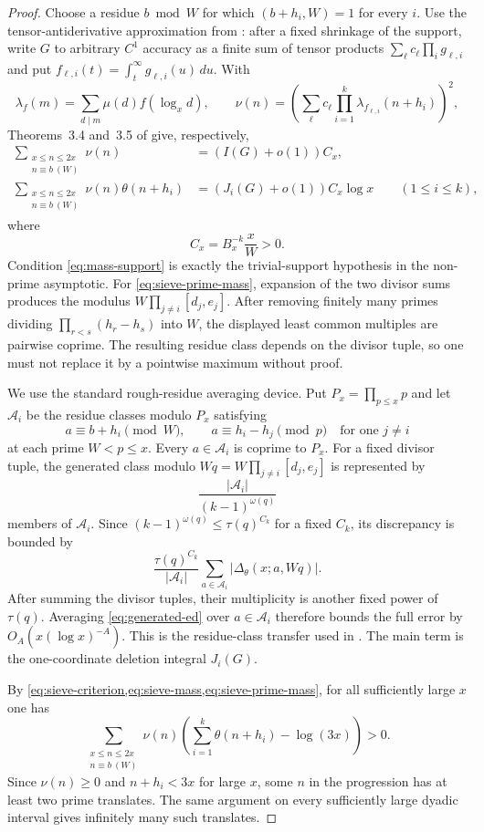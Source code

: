 \begin{proof}
Choose a residue $b\bmod W$ for which $(b+h_i,W)=1$ for every $i$.
Use the tensor-antiderivative approximation from
\cite[Sections~4--5]{PolymathSieve2014}: after a fixed shrinkage of the
support, write $G$ to arbitrary $C^1$ accuracy as a finite sum of tensor
products $\sum_\ell c_\ell\prod_i g_{\ell,i}$ and put
$f_{\ell,i}(t)=\int_t^\infty g_{\ell,i}(u)\,du$.  With
\[
 \lambda_f(m)=\sum_{d\mid m}\mu(d)f(\log_xd),\qquad
 \nu(n)=
 \left(\sum_\ell c_\ell
 \prod_{i=1}^k\lambda_{f_{\ell,i}}(n+h_i)\right)^2,
\]
    Theorems~3.4 and~3.5 of
\cite{PolymathSieve2014,PolymathSieveErratum2015} give, respectively,
\begin{align}
 \sum_{\substack{x\le n\le2x\\n\equiv b\ (W)}}\nu(n)
 &=(I(G)+o(1))C_x,\label{eq:sieve-mass}\\
 \sum_{\substack{x\le n\le2x\\n\equiv b\ (W)}}
 \nu(n)\theta(n+h_i)
 &=\left(J_i(G)+o(1)\right)C_x\log x
 \qquad(1\le i\le k),
 \label{eq:sieve-prime-mass}
\end{align}
where
\[
 C_x=B_x^{-k}\frac{x}{W}>0.
\]
Condition \cref{eq:mass-support} is exactly the trivial-support hypothesis in
the non-prime asymptotic.  For \cref{eq:sieve-prime-mass}, expansion of the
two divisor sums produces the modulus
$W\prod_{j\ne i}[d_j,e_j]$.  After removing finitely many primes dividing
$\prod_{r<s}(h_r-h_s)$ into $W$, the displayed least common multiples are
pairwise coprime.  The resulting residue class depends on the divisor tuple,
so one must not replace it by a pointwise maximum without proof.

We use the standard rough-residue averaging device.  Put
$P_x=\prod_{p\le x}p$ and let $\mathcal A_i$ be the residue classes modulo
$P_x$ satisfying
\[
 a\equiv b+h_i\pmod W,
 \qquad
 a\equiv h_i-h_j\pmod p
 \quad\text{for one }j\ne i
\]
at each prime $W<p\le x$.  Every $a\in\mathcal A_i$ is coprime to $P_x$.
For a fixed divisor tuple, the generated class modulo
$Wq=W\prod_{j\ne i}[d_j,e_j]$ is represented by
\[
 \frac{|\mathcal A_i|}{(k-1)^{\omega(q)}}
\]
members of $\mathcal A_i$.  Since
$(k-1)^{\omega(q)}\le\tau(q)^{C_k}$ for a fixed $C_k$, its discrepancy is
bounded by
\[
 \frac{\tau(q)^{C_k}}{|\mathcal A_i|}
 \sum_{a\in\mathcal A_i}|\Delta_\theta(x;a,Wq)|.
\]
After summing the divisor tuples, their multiplicity is another fixed power
of $\tau(q)$.  Averaging \cref{eq:generated-ed} over
$a\in\mathcal A_i$ therefore bounds the full error by
$O_A(x(\log x)^{-A})$.  This is the residue-class transfer used in
\cite[Section~2.4]{Stadlmann2026}.  The main term is the one-coordinate
deletion integral $J_i(G)$.

By \cref{eq:sieve-criterion,eq:sieve-mass,eq:sieve-prime-mass}, for all
sufficiently large $x$ one has
\[
 \sum_{\substack{x\le n\le2x\\n\equiv b\ (W)}}\nu(n)
 \left(\sum_{i=1}^k\theta(n+h_i)-\log(3x)\right)>0.
\]
Since $\nu(n)\ge0$ and $n+h_i<3x$ for large $x$, some $n$ in the
progression has at least two prime translates.
The same argument on every sufficiently large dyadic interval gives
infinitely many such translates.
\end{proof}

